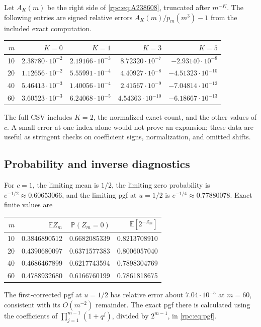 \documentclass[11pt]{article}
\theoremstyle{definition}
\theoremstyle{remark}
\newcommand{\E}{\mathbb E}
\newcommand{\Prob}{\mathbb P}
\numberwithin{equation}{section}
\begin{document}
Let $A_K(m)$ be the right side of \eqref{rpc:eq:A238608}, truncated after
$m^{-K}$. The following entries are signed relative errors
$A_K(m)/p_m(m^3)-1$ from the included exact computation.
\begin{center}
\small
\begin{tabular}{@{}r r r r r@{}}
\toprule
$m$ & $K=0$ & $K=1$ & $K=3$ & $K=5$\\
\midrule
10 & $2.38780\cdot10^{-2}$ & $2.19166\cdot10^{-3}$ & $8.72320\cdot10^{-7}$ & $-2.93140\cdot10^{-8}$\\
20 & $1.12656\cdot10^{-2}$ & $5.55991\cdot10^{-4}$ & $4.40927\cdot10^{-8}$ & $-4.51323\cdot10^{-10}$\\
40 & $5.46413\cdot10^{-3}$ & $1.40056\cdot10^{-4}$ & $2.41567\cdot10^{-9}$ & $-7.04814\cdot10^{-12}$\\
60 & $3.60523\cdot10^{-3}$ & $6.24068\cdot10^{-5}$ & $4.54363\cdot10^{-10}$ & $-6.18667\cdot10^{-13}$\\
\bottomrule
\end{tabular}
\end{center}
The full CSV includes $K=2$, the normalized exact count, and the other values
of $c$. A small error at one index alone would not prove an expansion;
these data are useful as stringent checks on coefficient signs, normalization,
and omitted shifts.

\subsection{Probability and inverse diagnostics}

For $c=1$, the limiting mean is $1/2$, the limiting zero probability is
$e^{-1/2}\approx0.60653066$, and the limiting pgf at $u=1/2$ is
$e^{-1/4}\approx0.77880078$. Exact finite values are
\begin{center}
\begin{tabular}{@{}r r r r@{}}
\toprule
$m$ & $\E Z_m$ & $\Prob(Z_m=0)$ & $\E[2^{-Z_m}]$\\
\midrule
10 & 0.3846890512 & 0.6682085339 & 0.8213708910\\
20 & 0.4390680097 & 0.6371577383 & 0.8006057040\\
40 & 0.4686467899 & 0.6217743594 & 0.7898304769\\
60 & 0.4788932680 & 0.6166760199 & 0.7861818675\\
\bottomrule
\end{tabular}
\end{center}
The first-corrected pgf at $u=1/2$ has relative error about
$7.04\cdot10^{-5}$ at $m=60$, consistent with its $O(m^{-2})$ remainder.
The exact pgf there is calculated using the coefficients of
$\prod_{j=1}^{m-1}(1+q^j)$, divided by $2^{m-1}$, in \eqref{rpc:eq:pgf}.
\end{document}
